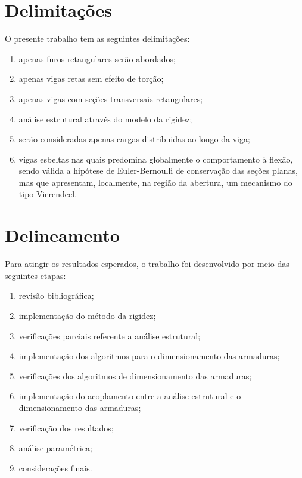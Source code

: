 \section{Delimitações}

O presente trabalho tem as seguintes delimitações:

\begin{enumerate}[label=\alph*)]
\item apenas furos retangulares serão abordados;

\item apenas vigas retas sem efeito de torção;

\item apenas vigas com seções transversais retangulares;

\item análise estrutural através do modelo da rigidez;

\item serão consideradas apenas cargas distribuidas ao longo da viga;

\item vigas esbeltas nas quais predomina globalmente o comportamento à flexão, sendo válida a hipótese de Euler-Bernoulli de conservação das seções planas, mas que apresentam, localmente, na região da abertura, um mecanismo do tipo Vierendeel.

\end{enumerate}

\section{Delineamento}

Para atingir os resultados esperados, o trabalho foi desenvolvido por meio das seguintes
etapas:

\begin{enumerate}[label=\alph*)]

\item revisão bibliográfica;

\item implementação do método da rigidez;

\item verificações parciais referente a análise estrutural;

\item implementação dos algoritmos para o dimensionamento das armaduras;

\item verificações dos algoritmos de dimensionamento das armaduras;

\item implementação do acoplamento entre a análise estrutural e o dimensionamento das armaduras;

\item verificação dos resultados;

\item análise paramétrica;

\item considerações finais.

\end{enumerate}

